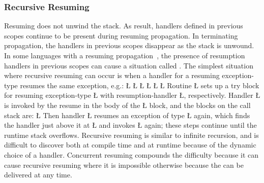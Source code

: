 \documentclass[openright,twoside]{report}
\newcommand{\BF}[1]{\Textbf{#1}}
\begin{document}
\subsubsection{Recursive Resuming}
\label{s:RecursiveResuming}

Resuming does not unwind the stack.
As result, handlers defined in previous scopes continue to be present during resuming propagation.
In terminating propagation, the handlers in previous scopes disappear as the stack is unwound.
In some languages with a resuming propagation~\cite{MacLaren77,Buhr92b,ExceptionalC}, the presence of resumption handlers in previous scopes can cause a situation called .
The simplest situation where recursive resuming can occur is when a handler for a resuming exception-type resumes the same exception, e.g.:
\LGinlinefalse\LGbegin\lgrinde
\L{}
\L{}
\L{\LB{}}
\L{\LB{}\Tab{8}{\K{\_Resume}\0\BF{\V{E}()};}}
\L{\LB{}\Tab{8}{\K{\_CatchResume}(\0\BF{\V{E}\0\&}\0)\0\{\0\K{\_Resume}\0\BF{\V{E}()};\0\}}}
\CE{}\L{\LB{\}}}
\endlgrinde\LGend
Routine \LGinlinetrue\LGbegin\lgrinde\L{}\endlgrinde\LGend{} sets up a try block for resuming exception-type \LGinlinetrue\LGbegin\lgrinde\L{}\endlgrinde\LGend{} with resumption-handler \LGinlinetrue\LGbegin\lgrinde\L{}\endlgrinde\LGend{}, respectively.
Handler \LGinlinetrue\LGbegin\lgrinde\L{}\endlgrinde\LGend{} is invoked by the resume in the body of the \LGinlinetrue\LGbegin\lgrinde\L{}\endlgrinde\LGend{} block, and the blocks on the call stack are:
\LGinlinefalse\LGbegin\lgrinde
\L{}
\endlgrinde\LGend
Then handler \LGinlinetrue\LGbegin\lgrinde\L{}\endlgrinde\LGend{} resumes an exception of type \LGinlinetrue\LGbegin\lgrinde\L{}\endlgrinde\LGend{} again, which finds the handler just above it at \LGinlinetrue\LGbegin\lgrinde\L{}\endlgrinde\LGend{} and invokes \LGinlinetrue\LGbegin\lgrinde\L{}\endlgrinde\LGend{} again;
these steps continue until the runtime stack overflows.
Recursive resuming is similar to infinite recursion, and is difficult to discover both at compile time and at runtime because of the dynamic choice of a handler.
Concurrent resuming compounds the difficulty because it can cause recursive resuming where it is impossible otherwise because the  can be delivered at any time.
\end{document}
